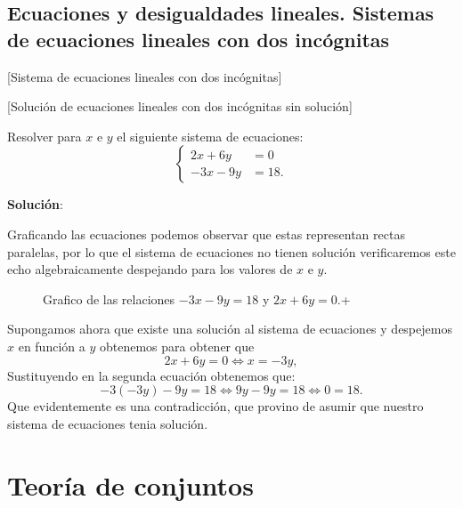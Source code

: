 \subsection{Ecuaciones y desigualdades lineales. Sistemas de ecuaciones lineales con dos incógnitas}


	[Sistema de ecuaciones lineales con dos incógnitas]

	[Solución de ecuaciones lineales con dos incógnitas sin solución]

	 Resolver para \(x\) e \(y\) el siguiente sistema de ecuaciones: 
		\[
			\begin{cases}
				2x + 6y &= 0 \\
				-3x - 9y &= 18.
			\end{cases}
		\]

		\noindent\textbf{Solución}:

		Graficando las ecuaciones podemos observar que estas representan rectas
		paralelas, por lo que el sistema de ecuaciones no tienen solución
		verificaremos este echo algebraicamente despejando para los valores de 
		\(x\) e \(y\).

		\begin{figure}[h]
		\begin{center}
		\end{center}
		\caption{Grafico de las relaciones \(-3x-9y=18\) y \(2x+6y=0\).+} 
		\end{figure}

		Supongamos ahora que existe una solución al sistema de
		ecuaciones y despejemos \(x\) en función a \(y\) obtenemos para obtener
		que
		\[
			2x + 6y = 0 \iff x = -3y,
		\]
		Sustituyendo en la segunda ecuación obtenemos que:
		\[
			-3(-3y) - 9y = 18 \iff 9y - 9y = 18 \iff 0 = 18.
		\]
		Que evidentemente es una contradicción, que provino de asumir que
		nuestro sistema de ecuaciones tenia solución. 


\section{Teoría de conjuntos}


